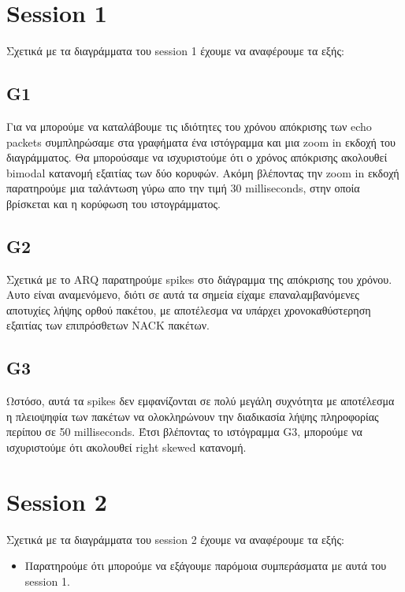 \documentclass[hidelinks, 12pt, a4paper]{article}
\begin{document}
\section{Session 1}
Σχετικά με τα διαγράμματα του session 1 έχουμε να αναφέρουμε τα εξής:

\subsection{G1}

Για να μπορούμε να καταλάβουμε τις ιδιότητες του χρόνου απόκρισης των echo packets συμπληρώσαμε στα γραφήματα ένα ιστόγραμμα και μια zoom in εκδοχή του διαγράμματος. Θα μπορούσαμε να ισχυριστούμε ότι ο χρόνος απόκρισης ακολουθεί bimodal κατανομή εξαιτίας των δύο κορυφών. Ακόμη βλέποντας την zoom in εκδοχή παρατηρούμε μια ταλάντωση γύρω απο την τιμή 30 milliseconds, στην οποία βρίσκεται και η κορύφωση του ιστογράμματος.

\subsection{G2}

Σχετικά με το ΑRQ παρατηρούμε spikes στο διάγραμμα της απόκρισης του χρόνου. Αυτο είναι αναμενόμενο, διότι σε αυτά τα σημεία είχαμε επαναλαμβανόμενες αποτυχίες λήψης ορθού πακέτου, με αποτέλεσμα να υπάρχει χρονοκαθύστερηση εξαιτίας των επιπρόσθετων NACK πακέτων.

\subsection{G3}

Ωστόσο, αυτά τα spikes δεν εμφανίζονται σε πολύ μεγάλη συχνότητα με αποτέλεσμα η πλειοψηφία των πακέτων να ολοκληρώνουν την διαδικασία λήψης πληροφορίας περίπου σε 50 milliseconds. Έτσι βλέποντας το ιστόγραμμα G3, μπορούμε να ισχυριστούμε ότι ακολουθεί right skewed κατανομή.

\section{Session 2}

Σχετικά με τα διαγράμματα του session 2 έχουμε να αναφέρουμε τα εξής:
\begin{itemize}
    \item Παρατηρούμε ότι μπορούμε να εξάγουμε παρόμοια συμπεράσματα με αυτά του session 1.
\end{itemize}
\end{document}
